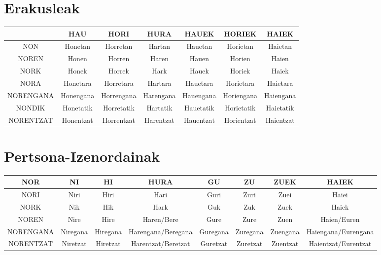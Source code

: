 \documentclass[12pt, a4paper, landscape]{article}
\begin{document}
\section{Erakusleak}
\begin{table}[h]
\begin{center}
\begin{tabular}{|c|c|c|c|c|c|c|}
\hline
& HAU & HORI & HURA & HAUEK & HORIEK & HAIEK \\
\hline
NON & Honetan & Horretan & Hartan & Hauetan & Horietan & Haietan \\
\hline
NOREN & Honen & Horren & Haren & Hauen & Horien & Haien \\
\hline
NORK & Honek & Horrek & Hark & Hauek & Horiek & Haiek \\
\hline
NORA & Honetara & Horretara & Hartara & Hauetara & Horietara & Haietara \\ 
\hline
NORENGANA & Honengana & Horrengana & Harengana & Hauengana & Horiengana & Haiengana \\
\hline
NONDIK & Honetatik & Horretatik & Hartatik & Hauetatik & Horietatik & Haietatik \\
\hline
NORENTZAT & Honentzat & Horrentzat & Harentzat & Hauentzat & Horientzat & Haientzat \\
\hline
\end{tabular}
\end{center}
\end{table}
\newpage

\section{Pertsona-Izenordainak}
\begin{table}[h]
\begin{center}
\begin{tabular}{|c|c|c|c|c|c|c|c|}
\hline
NOR & NI & HI & HURA & GU & ZU & ZUEK & HAIEK \\ 
\hline
NORI & Niri & Hiri & Hari & Guri & Zuri & Zuei & Haiei \\
\hline
NORK & Nik & Hik & Hark & Guk & Zuk & Zuek & Haiek \\
\hline
NOREN & Nire & Hire & Haren/Bere & Gure & Zure & Zuen & Haien/Euren \\
\hline
NORENGANA & Niregana & Hiregana & Harengana/Beregana & Guregana & Zuregana & Zuengana & Haiengana/Eurengana \\
\hline
NORENTZAT & Niretzat & Hiretzat & Harentzat/Beretzat & Guretzat & Zuretzat & Zuentzat & Haientzat/Eurentzat \\
\hline
\end{tabular}
\end{center}
\end{table}
\end{document}
